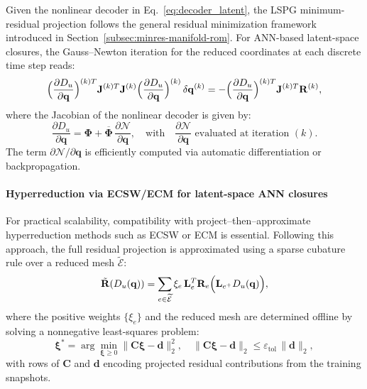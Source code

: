 Given the nonlinear decoder in Eq.~\eqref{eq:decoder_latent}, the LSPG minimum-residual projection follows the general residual minimization framework introduced in Section~\ref{subsec:minres-manifold-rom}. For ANN-based latent-space closures, the Gauss--Newton iteration for the reduced coordinates at each discrete time step reads:
\begin{equation}
\Bigl(\frac{\partial D_u}{\partial \mathbf{q}}\Bigr)^{(k)T} 
\mathbf{J}^{(k)T} \mathbf{J}^{(k)}
\Bigl(\frac{\partial D_u}{\partial \mathbf{q}}\Bigr)^{(k)}
\,\delta\mathbf{q}^{(k)}
= 
-\Bigl(\frac{\partial D_u}{\partial \mathbf{q}}\Bigr)^{(k)T}
\mathbf{J}^{(k)T}\mathbf{R}^{(k)},
\label{eq:lspg_iter_ann}
\end{equation}
where the Jacobian of the nonlinear decoder is given by:
\begin{equation}
\frac{\partial D_u}{\partial\mathbf{q}} 
= \boldsymbol{\Phi} + \overline{\boldsymbol{\Phi}}\,\frac{\partial\mathcal{N}}{\partial\mathbf{q}},
\quad
\text{with} \quad 
\frac{\partial\mathcal{N}}{\partial\mathbf{q}} \text{ evaluated at iteration } (k).
\label{eq:decoder_derivative_ann}
\end{equation}
The term $\partial\mathcal{N}/\partial\mathbf{q}$ is efficiently computed via automatic differentiation or backpropagation.
  



\paragraph{Hyperreduction via ECSW/ECM for latent-space ANN closures}

For practical scalability, compatibility with project--then--approximate hyperreduction methods such as ECSW or ECM is essential. Following this approach, the full residual projection is approximated using a sparse cubature rule over a reduced mesh $\widetilde{\mathcal{E}}$:
\begin{equation}
\tilde{\mathbf{R}}(D_u(\mathbf{q})) 
= \sum_{e \in \widetilde{\mathcal{E}}} 
\xi_{e}\,\mathbf{L}_{e}^{T}\mathbf{R}_{e}\Bigl(\mathbf{L}_{e^{+}}D_u(\mathbf{q})\Bigr),
\end{equation}
where the positive weights $\{\xi_{e}\}$ and the reduced mesh are determined offline by solving a nonnegative least-squares problem:
\begin{equation}
\boldsymbol{\xi}^{*} = \arg\min_{\boldsymbol{\xi} \geq 0} 
\|\mathbf{C}\boldsymbol{\xi} - \mathbf{d}\|_2^2, 
\quad 
\|\mathbf{C}\boldsymbol{\xi} - \mathbf{d}\|_2 
\leq \varepsilon_{\text{tol}}\,\|\mathbf{d}\|_2,
\end{equation}
with rows of $\mathbf{C}$ and $\mathbf{d}$ encoding projected residual contributions from the training snapshots. 

